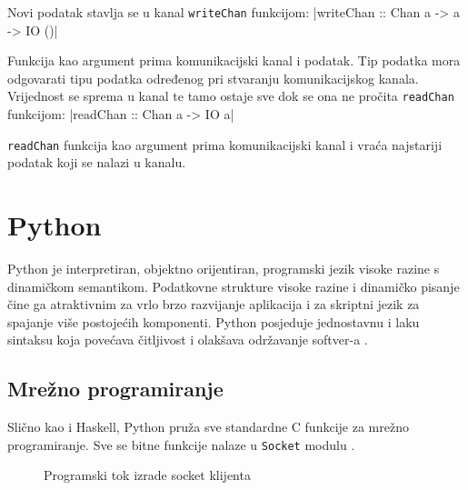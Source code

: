Novi podatak stavlja se u kanal \texttt{writeChan}
funkcijom:
|writeChan :: Chan a -> a -> IO ()|

Funkcija kao argument prima komunikacijski kanal i podatak. Tip podatka mora
odgovarati tipu podatka određenog pri stvaranju komunikacijskog kanala.
Vrijednost se sprema u kanal te tamo ostaje sve dok se ona ne pročita
\texttt{readChan} funkcijom:
|readChan :: Chan a -> IO a|

\texttt{readChan} funkcija kao argument prima komunikacijski kanal
i vraća najstariji podatak koji se nalazi u kanalu.

\newpage
\section{Python}

Python je interpretiran, objektno orijentiran, programski jezik visoke razine
s dinamičkom semantikom. Podatkovne strukture visoke razine i dinamičko pisanje
čine ga atraktivnim za vrlo brzo razvijanje aplikacija i za skriptni jezik za
spajanje više postojećih komponenti.
Python posjeduje jednostavnu i laku sintaksu koja povećava čitljivost i
olakšava održavanje softver-a \cite{python_ref}.

\subsection{Mrežno programiranje}

Slično kao i Haskell, Python pruža sve standardne C funkcije za mrežno
programiranje. Sve se bitne funkcije nalaze u \texttt{Socket}
modulu \cite{python_socket}.

\begin{figure}[H]
\centering
{}
\caption{Programski tok izrade socket klijenta}
\label{fig:client_creation}
\end{figure}

